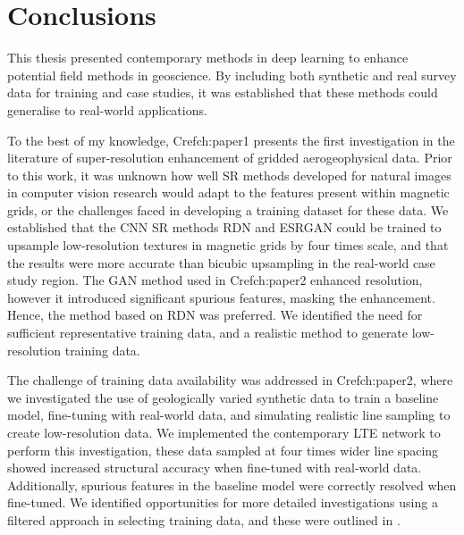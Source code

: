 \printbibliography{}

\chapter{Conclusions}
This thesis presented contemporary methods in deep learning to enhance potential field methods in geoscience.
By including both synthetic and real survey data for training and case studies, it was established that these methods could generalise to real-world applications.

To the best of my knowledge, Cref{ch:paper1} presents the first investigation in the literature of super-resolution enhancement of gridded aerogeophysical data.
Prior to this work, it was unknown how well SR methods developed for natural images in computer vision research would adapt to the features present within magnetic grids, or the challenges faced in developing a training dataset for these data.
We established that the CNN SR methods RDN and ESRGAN could be trained to upsample low-resolution textures in magnetic grids by four times scale, and that the results were more accurate than bicubic upsampling in the real-world case study region.
The GAN method used in Cref{ch:paper2} enhanced resolution, however it introduced significant spurious features, masking the enhancement.
Hence, the method based on RDN was preferred.
We identified the need for sufficient representative training data, and a realistic method to generate low-resolution training data.

The challenge of training data availability was addressed in Cref{ch:paper2}, where we investigated the use of geologically varied synthetic data to train a baseline model, fine-tuning with real-world data, and simulating realistic line sampling to create low-resolution data.
We implemented the contemporary LTE network to perform this investigation, these data sampled at four times wider line spacing showed increased structural accuracy when fine-tuned with real-world data.
Additionally, spurious features in the baseline model were correctly resolved when fine-tuned.
We identified opportunities for more detailed investigations using a filtered approach in selecting training data, and these were outlined in .

